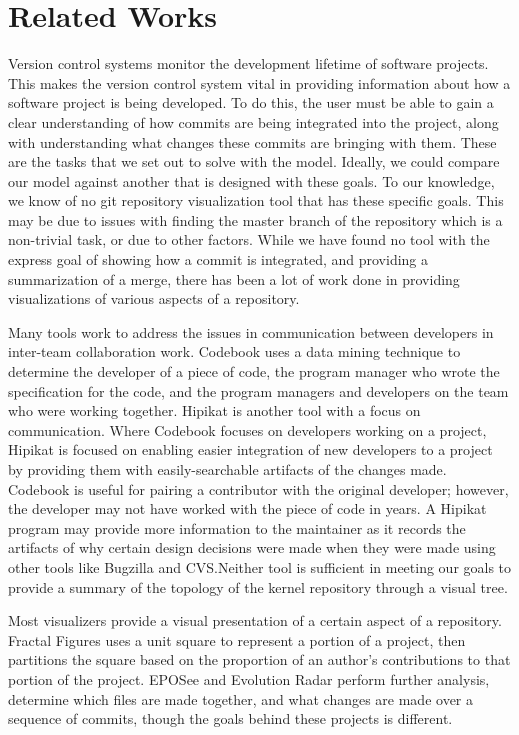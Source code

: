
\section{Related Works}
\label{sec:related_works}

Version control systems monitor the development lifetime of software
projects. This makes the version control system vital in providing
information about how a software project is being developed. To do this,
the user must be able to gain a clear understanding of how commits are
being integrated into the project, along with understanding what changes
these commits are bringing with them. These are the tasks that we set
out to solve with the \mt model. Ideally, we could compare our model
against another that is designed with these goals. To our knowledge, we
know of no git repository visualization tool that has these specific
goals. This may be due to issues with finding the master branch of the
repository which is a non-trivial task, or due to other factors. While
we have found no tool with the express goal of showing how a commit is
integrated, and providing a summarization of a merge, there has been a
lot of work done in providing visualizations of various aspects of a
repository.

Many tools work to address the issues in communication between
developers in inter-team collaboration work. Codebook\cite{Begel2010}
uses a data mining technique to determine the developer of a piece of
code, the program manager who wrote the specification for the code, and
the program managers and developers on the team who were working
together. Hipikat\cite{Cubranic2005} is another tool with a focus on
communication. Where Codebook focuses on developers working on a
project, Hipikat is focused on enabling easier integration of new
developers to a project by providing them with easily-searchable
artifacts of the changes made. Codebook is useful for pairing a
contributor with the original developer; however, the developer may not
have worked with the piece of code in years. A Hipikat program may
provide more information to the maintainer as it records the artifacts
of why certain design decisions were made when they were made using
other tools like Bugzilla and CVS.\@ Neither tool is sufficient in
meeting our goals to provide a summary of the topology of the kernel
repository through a visual tree.

Most visualizers provide a visual presentation of a certain aspect of a
repository. Fractal Figures\cite{Ambros2005} uses a unit square to
represent a portion of a project, then partitions the square based on
the proportion of an author's contributions to that portion of the
project. EPOSee\cite{Burch2005} and Evolution Radar\cite{Ambros2009}
perform further analysis, determine which files are made together, and
what changes are made over a sequence of commits, though the goals
behind these projects is different.

